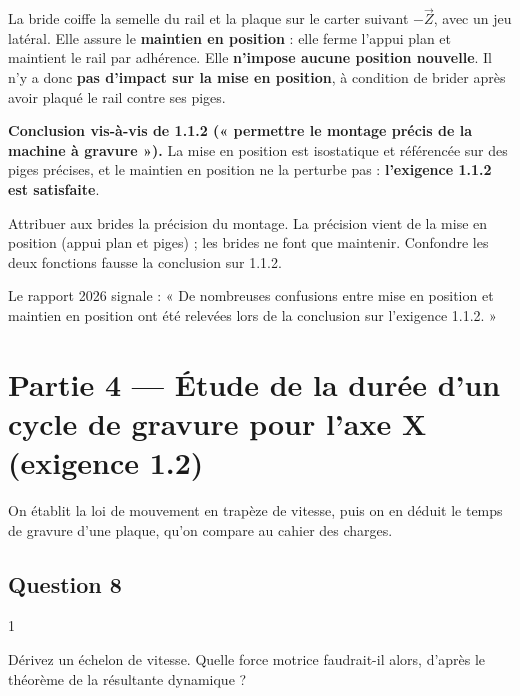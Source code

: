 \documentclass[11pt,a4paper]{article}
\begin{document}
La bride coiffe la semelle du rail et la plaque sur le carter suivant \(-\vec Z\), avec un jeu latéral. Elle assure le \textbf{maintien en position} : elle ferme l'appui plan et maintient le rail par adhérence. Elle \textbf{n'impose aucune position nouvelle}. Il n'y a donc \textbf{pas d'impact sur la mise en position}, à condition de brider après avoir plaqué le rail contre ses piges.

\textbf{Conclusion vis-à-vis de 1.1.2 (« permettre le montage précis de la machine à gravure »).} La mise en position est isostatique et référencée sur des piges précises, et le maintien en position ne la perturbe pas : \textbf{l'exigence 1.1.2 est satisfaite}.

\begin{piege}

Attribuer aux brides la précision du montage. La précision vient de la mise en position (appui plan et piges) ; les brides ne font que maintenir. Confondre les deux fonctions fausse la conclusion sur 1.1.2.

\end{piege}

\begin{jury}

Le rapport 2026 signale : « De nombreuses confusions entre mise en position et maintien en position ont été relevées lors de la conclusion sur l'exigence 1.1.2. »

\end{jury}

\hypertarget{partie-4-uxe9tude-de-la-duruxe9e-dun-cycle-de-gravure-pour-laxe-x-exigence-1.2}{%
\section{Partie 4 --- Étude de la durée d'un cycle de gravure pour l'axe X (exigence 1.2)}\label{partie-4-uxe9tude-de-la-duruxe9e-dun-cycle-de-gravure-pour-laxe-x-exigence-1.2}}

On établit la loi de mouvement en trapèze de vitesse, puis on en déduit le temps de gravure d'une plaque, qu'on compare au cahier des charges.

\hypertarget{question-8}{%
\subsection{Question 8}\label{question-8}}

\begin{indication}{1}

Dérivez un échelon de vitesse. Quelle force motrice faudrait-il alors, d'après le théorème de la résultante dynamique ?

\end{indication}
\end{document}
